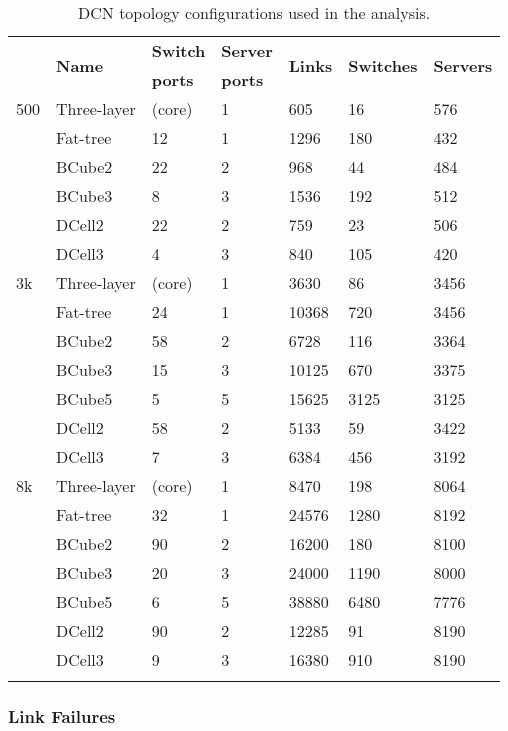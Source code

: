 \begin{table}
\caption{DCN topology configurations used in the analysis.}
\label{tab:configurations}
\begin{tabular}{lllllll}
\hline\noalign{\smallskip}
\hline \multirow{2}{*}{\bf Size}	&\multirow{2}{*}{\bf Name} 	& {\bf Switch} &{\bf Server} &\multirow{2}{*}{\bf Links} &\multirow{2}{*}{\bf Switches} &\multirow{2}{*}{\bf Servers}\\
& &  {\bf ports} & {\bf ports} &  & &\\ 
\noalign{\smallskip}\hline\noalign{\smallskip}
\hline\multirow{6}{*} {500} & Three-layer & (core) & 1 & 605 & 16 & 576\\
& Fat-tree & 12 & 1 & 1296 & 180 & 432\\
& BCube2 & 22 & 2 & 968 & 44 & 484\\
& BCube3 & 8 & 3 & 1536 & 192 & 512\\
& DCell2 & 22 & 2 & 759 & 23 & 506\\
& DCell3 & 4 & 3 & 840 & 105 & 420\\
\noalign{\smallskip}\hline	
\multirow{7}{*} {3k} & Three-layer & (core)  & 1 & 3630 & 86 & 3456\\
& Fat-tree & 24 & 1 & 10368 & 720 & 3456\\
& BCube2 & 58 & 2 & 6728 & 116 & 3364\\
& BCube3 & 15 & 3 & 10125 & 670 & 3375\\
& BCube5 & 5 & 5 & 15625 & 3125 & 3125\\
& DCell2 & 58 & 2 & 5133 & 59 & 3422\\
& DCell3 & 7 & 3 & 6384 & 456 & 3192\\
\noalign{\smallskip}\hline	
\multirow{7}{*} {8k} & Three-layer & (core)  & 1 & 8470 & 198 & 8064\\
& Fat-tree & 32 & 1 & 24576 & 1280 & 8192\\
& BCube2 & 90 & 2 & 16200 & 180 & 8100\\
& BCube3 & 20 & 3 & 24000 & 1190 & 8000\\
& BCube5 & 6 & 5 & 38880 & 6480 & 7776\\
& DCell2 & 90 & 2 & 12285 & 91 & 8190\\
& DCell3 & 9 & 3 & 16380 & 910 & 8190\\
\noalign{\smallskip}\hline	
\end{tabular}
\end{table}

\subsubsection{Link Failures}
\label{sec:perfEvaluationLinkReliable}

